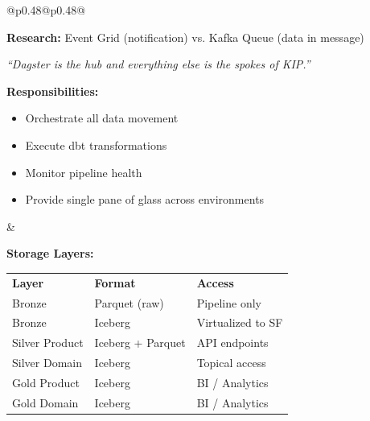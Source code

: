 \documentclass[10pt, a4paper]{article}
\begin{document}
{\begin{tabular}[t]{@{}p{}@{\hspace{0.02\textwidth}}p{}@{}}
{\vspace{0.1em}

\textbf{Research:} Event Grid (notification) vs. Kafka Queue (data in message)
}

\vspace{0.3em}

\begin{tikzpicture}
    \node[fill=kiporange!20, rounded corners=3pt, inner sep=3pt, text width=\linewidth-6pt, align=left] {\textbf{Dagster: The Hub}};
\end{tikzpicture}

\vspace{0.1em}

{\footnotesize
\textit{``Dagster is the hub and everything else is the spokes of KIP.''}

\vspace{0.1em}

\textbf{Responsibilities:}
\begin{itemize}[leftmargin=1em, itemsep=0em]
    \item Orchestrate all data movement
    \item Execute dbt transformations
    \item Monitor pipeline health
    \item Provide single pane of glass across environments
\end{itemize}
}

&
\vspace{0pt}
\raggedright

\begin{tikzpicture}
    \node[fill=kiporange!20, rounded corners=3pt, inner sep=3pt, text width=\linewidth-6pt, align=left] {\textbf{Medallion Structure Lake}};
\end{tikzpicture}

\vspace{0.1em}

{\footnotesize
\textbf{Storage Layers:}

\vspace{0.1em}

\renewcommand{\arraystretch}{1.2}
\begin{tabularx}{\linewidth}{@{}lXl@{}}
\rowcolor{black!10}
\textbf{Layer} & \textbf{Format} & \textbf{Access} \\
\rowcolor{white}
Bronze & Parquet (raw) & Pipeline only \\
\rowcolor{black!5}
Bronze & Iceberg & Virtualized to SF \\
\rowcolor{white}
Silver Product & Iceberg + Parquet & API endpoints \\
\rowcolor{black!5}
Silver Domain & Iceberg & Topical access \\
\rowcolor{white}
Gold Product & Iceberg & BI / Analytics \\
\rowcolor{black!5}
Gold Domain & Iceberg & BI / Analytics \\
\end{tabularx}
\renewcommand{\arraystretch}{1.0}

}
\end{tabular}}
\end{document}
